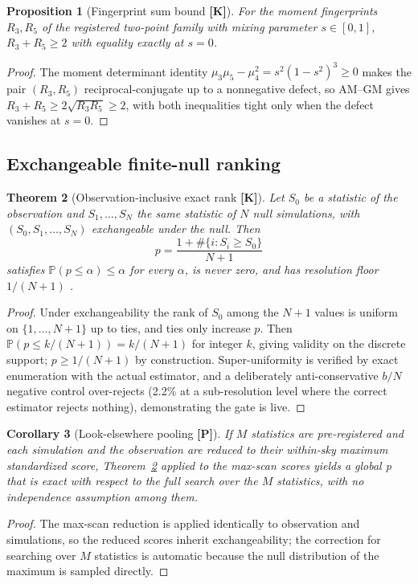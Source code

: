 \documentclass[10pt]{article}
\newtheorem{theorem}{Theorem}[section]
\newtheorem{proposition}[theorem]{Proposition}
\newtheorem{corollary}[theorem]{Corollary}
\theoremstyle{definition}
\newcommand{\tier}[1]{\textbf{[#1]}}
\begin{document}
\begin{proposition}[Fingerprint sum bound \tier{K}]
\label{prop:tsum}
For the moment fingerprints $R_3, R_5$ of the registered two-point
family with mixing parameter $s \in [0,1]$, $R_3 + R_5 \ge 2$ with
equality exactly at $s = 0$.
\end{proposition}
\begin{proof}
The moment determinant identity
$\mu_3\mu_5 - \mu_4^2 = s^2(1-s^2)^3 \ge 0$ makes the pair
$(R_3, R_5)$ reciprocal-conjugate up to a nonnegative defect, so
AM--GM gives $R_3 + R_5 \ge 2\sqrt{R_3 R_5} \ge 2$, with both
inequalities tight only when the defect vanishes at $s = 0$.
\end{proof}

\subsection{Exchangeable finite-null ranking}

\begin{theorem}[Observation-inclusive exact rank \tier{K}]
\label{thm:rank}
Let $S_0$ be a statistic of the observation and $S_1,\dots,S_N$ the
same statistic of $N$ null simulations, with
$(S_0, S_1, \dots, S_N)$ exchangeable under the null. Then
\begin{equation}
p = \frac{1 + \#\{i : S_i \ge S_0\}}{N + 1}
\end{equation}
satisfies $\mathbb P(p \le \alpha) \le \alpha$ for every $\alpha$, is
never zero, and has resolution floor $1/(N+1)$
\cite{PhipsonSmyth2010}.
\end{theorem}
\begin{proof}
Under exchangeability the rank of $S_0$ among the $N{+}1$ values is
uniform on $\{1,\dots,N{+}1\}$ up to ties, and ties only increase $p$.
Then $\mathbb P(p \le k/(N{+}1)) = k/(N{+}1)$ for integer $k$, giving
validity on the discrete support; $p \ge 1/(N+1)$ by construction.
Super-uniformity is verified by exact enumeration with the actual
estimator, and a deliberately anti-conservative $b/N$ negative
control over-rejects (2.2\% at a sub-resolution level where the
correct estimator rejects nothing), demonstrating the gate is live.
\end{proof}

\begin{corollary}[Look-elsewhere pooling \tier{P}]
\label{cor:pool}
If $M$ statistics are pre-registered and each simulation and the
observation are reduced to their within-sky maximum standardized score,
Theorem~\ref{thm:rank} applied to the max-scan scores yields a global
p that is exact with respect to the full search over the $M$
statistics, with no independence assumption among them.
\end{corollary}
\begin{proof}
The max-scan reduction is applied identically to observation and
simulations, so the reduced scores inherit exchangeability; the
correction for searching over $M$ statistics is automatic because the
null distribution of the maximum is sampled directly.
\end{proof}
\end{document}
